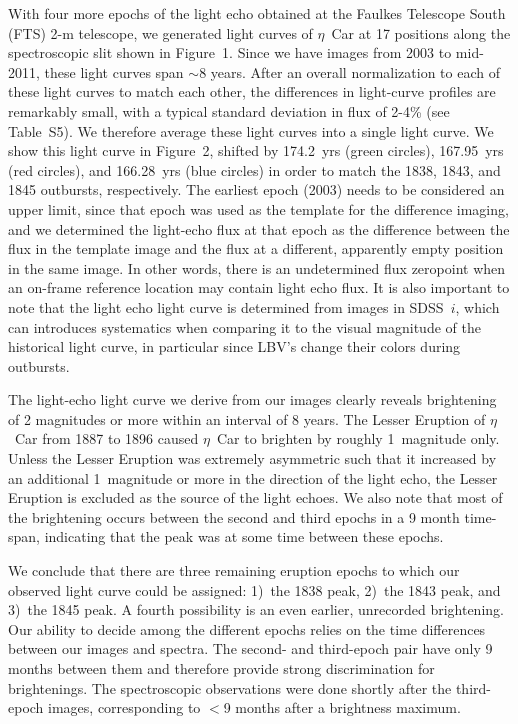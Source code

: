 With four more epochs of the light echo obtained at the Faulkes
Telescope South (FTS) 2-m telescope, we generated light curves of
$\eta$~Car at 17 positions along the spectroscopic slit shown in
Figure~1.
\ifcheck
\fi
Since we have images from 2003 to mid-2011, these light curves span
$\sim$8 years.  After an overall normalization to each of these light
curves to match each other, the differences in light-curve profiles
are remarkably small, with a typical standard deviation in flux of
2-4\%
(see Table~S5).
\ifcheck
\fi
We therefore average these light curves into a single light curve. We
show this light curve in Figure~2,
\ifcheck
\fi
shifted by 174.2~yrs (green circles), 167.95~yrs (red circles), and
166.28~yrs (blue circles) in order to match the 1838, 1843, and 1845
outbursts, respectively. The earliest epoch (2003) needs to be
considered an upper limit, since that epoch was used as the template
for the difference imaging, and we determined the light-echo flux at
that epoch as the difference between the flux in the template image
and the flux at a different, apparently empty position in the same
image. In other words, there is an undetermined flux zeropoint when an
on-frame reference location may contain light echo flux.
It is also important to note that the light echo light curve is
determined from images in SDSS~$i$, which can introduces systematics
when comparing it to the visual magnitude of the historical light
curve, in particular since LBV's change their colors during outbursts.

The light-echo light curve we derive from our images clearly reveals
brightening of 2 magnitudes or more within an interval of 8 years. The
Lesser Eruption of $\eta$~Car from 1887 to 1896 caused $\eta$~Car to
brighten by roughly 1~magnitude only. Unless the Lesser Eruption was
extremely asymmetric such that it increased by an additional
1~magnitude or more in the direction of the light echo, the Lesser
Eruption is excluded as the source of the light echoes.  We also note
that most of the brightening occurs between the second and third
epochs in a 9 month time-span, indicating that the peak was at some
time between these epochs.

We conclude that there are three remaining eruption epochs to which
our observed light curve could be assigned: 1)~the 1838 peak, 2)~the
1843 peak, and 3)~the 1845 peak. A fourth possibility is an even
earlier, unrecorded brightening. Our ability to decide among the
different epochs relies on the time differences between our images
and spectra. The second- and third-epoch pair have only 9 months
between them and therefore provide strong discrimination for
brightenings. The spectroscopic observations were done shortly after
the third-epoch images, corresponding to $<$9 months after a
brightness maximum.

